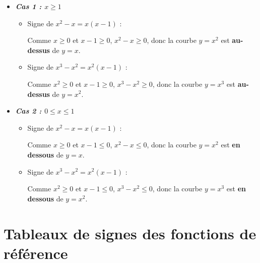 \begin{demo}
	\nline
	\begin{itemize}[itemsep=2mm]
		\item \emph{\textbf{Cas 1 : $x \ge 1$}}
		      \begin{itemize}[itemsep=1mm]
			      \item Signe de $x^2 - x = x(x - 1)$ :

			            Comme $x \ge 0$ et $x - 1 \ge 0$, $x^2 - x \ge 0$, donc la courbe $y = x^2$ est \textbf{au-dessus} de $y = x$.
			      \item Signe de $x^3 - x^2 = x^2(x - 1)$ :

			            Comme $x^2 \ge 0$ et $x - 1 \ge 0$, $x^3 - x^2 \ge 0$, donc la courbe $y = x^3$ est \textbf{au-dessus} de $y = x^2$.
		      \end{itemize}

		\item \emph{\textbf{Cas 2 : $0 \le x \le 1$}}
		      \begin{itemize}[itemsep=1mm]
			      \item Signe de $x^2 - x = x(x - 1)$ :

			            Comme $x \ge 0$ et $x - 1 \le 0$, $x^2 - x \le 0$, donc la courbe $y = x^2$ est \textbf{en dessous} de $y = x$.
			      \item Signe de $x^3 - x^2 = x^2(x - 1)$ :

			            Comme $x^2 \ge 0$ et $x - 1 \le 0$, $x^3 - x^2 \le 0$, donc la courbe $y = x^3$ est \textbf{en dessous} de $y = x^2$.
		      \end{itemize}
	\end{itemize}
\end{demo}

\section{Tableaux de signes des fonctions de référence}

